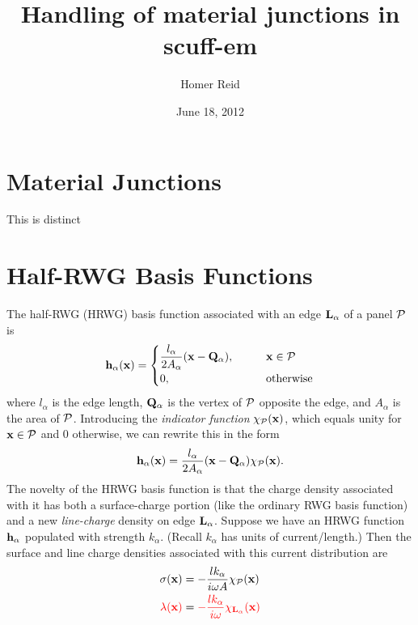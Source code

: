 \documentclass[letterpaper]{article}
\title {Handling of material junctions in {\sc scuff-em}}
\author {Homer Reid}
\date {June 18, 2012}
\begin{document}
\pagestyle{myheadings}
\maketitle

\tableofcontents

\newpage
\section{Material Junctions}

This is distinct 

\newpage
\section{Half-RWG Basis Functions}

The half-RWG (HRWG) basis function associated with 
an edge $\mathbf{L}_\alpha$ of a panel $\mathcal{P}$ is
$$ \mathbf{h}_\alpha(\mathbf{x}) = 
   \begin{cases}
   \displaystyle{ \frac{l_\alpha}{2A_\alpha}(\mathbf{x} - \mathbf{Q}_\alpha)}, 
   \qquad & \mathbf{x} \in \mathcal{P} 
   \\[5pt]
   0, \qquad & \text{otherwise}
   \end{cases}
$$
where $l_\alpha$ is the edge length, $\mathbf{Q}_\alpha$ is 
the vertex of $\mathcal{P}$ opposite the edge, and $A_\alpha$ 
is the area of $\mathcal{P}$.
Introducing the \textit{indicator function} $\chi_{\mathcal{P}}(\mathbf{x})$, 
which equals unity for $\mathbf{x}\in \mathcal{P}$ and 0 otherwise, 
we can rewrite this in the form
$$ \mathbf{h}_\alpha(\mathbf{x}) = 
   \frac{l_\alpha}{2A_\alpha}(\mathbf{x} - \mathbf{Q}_\alpha)\chi_{\mathcal{P}}(\mathbf{x}).
$$
The novelty of the HRWG basis function is that the charge density
associated with it has both a surface-charge portion 
(like the ordinary RWG basis function) and a new \textit{line-charge}
density on edge $\mathbf{L}_\alpha$. Suppose we have an HRWG function
$\mathbf{h}_\alpha$ populated with strength $k_\alpha$. (Recall $k_\alpha$
has units of current/length.) Then the surface and line charge
densities associated with this current distribution are 
\begin{align*}
  \sigma(\mathbf{x})
 &=
 -\frac{lk_\alpha}{i\omega A}\chi_{\mathcal{P}}(\mathbf{x})
\\
\textcolor{red}{ \lambda(\mathbf{x})}
 &=
\textcolor{red}{-\frac{lk_\alpha}{i\omega}\chi_{\mathbf{L}_\alpha}(\mathbf{x})}
\end{align*}
\end{document}
